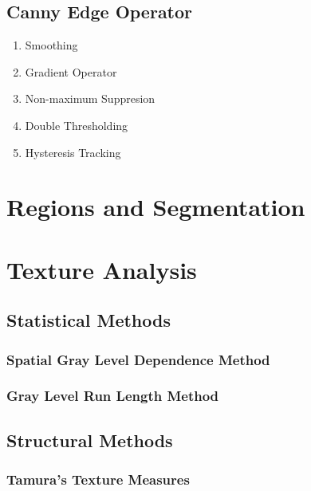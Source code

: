 \documentclass{article}
\begin{document}
\begin{multicols}{2}
\subsection{Canny Edge Operator}
\begin{enumerate}
        \item Smoothing
        \item Gradient Operator
        \item Non-maximum Suppresion
        \item Double Thresholding
        \item Hysteresis Tracking
\end{enumerate}

\section{Regions and Segmentation}

\section{Texture Analysis}
\subsection{Statistical Methods}
\subsubsection{Spatial Gray Level Dependence Method}
\subsubsection{Gray Level Run Length Method}
\subsection{Structural Methods}
\subsubsection{Tamura's Texture Measures}




\end{multicols}
\end{document}
